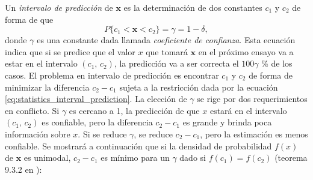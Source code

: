 \documentclass[a4paper]{report}
\newcommand{\x}{\mathbf{x}}
\begin{document}
Un \emph{intervalo de predicción} de \(\x\) es la determinación de dos constantes \(c_1\) y \(c_2\) de forma de que
\begin{equation}\label{eq:statistics_interval_prediction}
  P\{c_1<\x<c_2\}=\gamma=1-\delta,
\end{equation}
donde \(\gamma\) es una constante dada llamada \emph{coeficiente de confianza}. Esta ecuación indica que si se predice que el valor \(x\) que tomará \(\x\) en el próximo ensayo va a estar en el intervalo \((c_1,\,c_2)\), la predicción va a ser correcta el \(100\gamma\) \% de los casos. El problema en intervalo de predicción es encontrar \(c_1\) y \(c_2\) de forma de minimizar la diferencia \(c_2-c_1\) sujeta a la restricción dada por la ecuación \ref{eq:statistics_interval_prediction}. La elección de \(\gamma\) se rige por dos requerimientos en conflicto. Si \(\gamma\) es cercano a 1, la predicción de que \(x\) estará en el intervalo \((c_1,\,c_2)\) es confiable, pero la diferencia \(c_2-c_1\) es grande y brinda poca información sobre \(x\). Si se reduce \(\gamma\), se reduce \(c_2-c_1\), pero la estimación es menos confiable. Se mostrará a continuación que si la densidad de probabilidad \(f(x)\) de \(\x\) es unimodal, \(c_2-c_1\) es mínimo para un \(\gamma\) dado si \(f(c_1)=f(c_2)\) (teorema 9.3.2 en \cite{casella2001statistical}):
\end{document}
